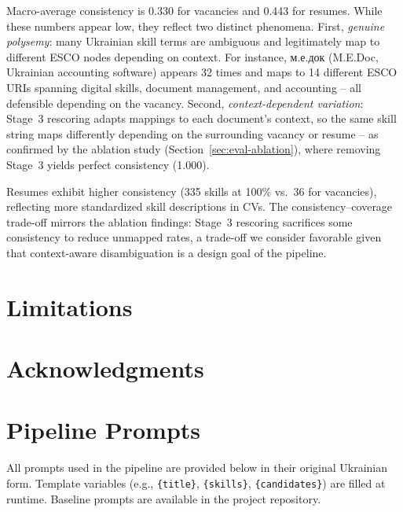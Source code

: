 \documentclass[11pt]{article}
\newcommand{\uk}[1]{{\fontencoding{T2A}\selectfont #1}}
\begin{document}
Macro-average consistency is 0.330 for vacancies and 0.443 for resumes. While these numbers appear low, they reflect two distinct phenomena. First, \emph{genuine polysemy}: many Ukrainian skill terms are ambiguous and legitimately map to different ESCO nodes depending on context. For instance, \uk{м.е.док} (M.E.Doc, Ukrainian accounting software) appears 32 times and maps to 14 different ESCO URIs spanning digital skills, document management, and accounting -- all defensible depending on the vacancy. Second, \emph{context-dependent variation}: Stage~3 rescoring adapts mappings to each document's context, so the same skill string maps differently depending on the surrounding vacancy or resume -- as confirmed by the ablation study (Section~\ref{sec:eval-ablation}), where removing Stage~3 yields perfect consistency (1.000).

Resumes exhibit higher consistency (335 skills at 100\% vs.\ 36 for vacancies), reflecting more standardized skill descriptions in CVs. The consistency--coverage trade-off mirrors the ablation findings: Stage~3 rescoring sacrifices some consistency to reduce unmapped rates, a trade-off we consider favorable given that context-aware disambiguation is a design goal of the pipeline.

\section*{Limitations}



\section*{Acknowledgments}



%


\appendix

\section{Pipeline Prompts}
\label{app:prompts}

All prompts used in the pipeline are provided below in their original Ukrainian form. Template variables (e.g., \texttt{\{title\}}, \texttt{\{skills\}}, \texttt{\{candidates\}}) are filled at runtime. Baseline prompts are available in the project repository.
\end{document}
